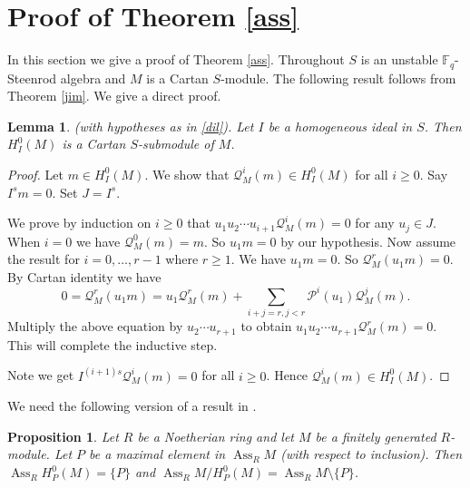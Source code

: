 \documentclass{amsart}
\newcommand{\F}{\mathbb{F} }
\newcommand{\Pc}{\mathcal{P} }
\newcommand{\Qc}{\mathcal{Q} }
\newcommand{\Ass}{\operatorname{Ass}}
\theoremstyle{plain}
\newtheorem{lemma}[theorem]{Lemma}
\newtheorem{proposition}[theorem]{Proposition}
\theoremstyle{definition}
\theoremstyle{remark}
\begin{document}
\section{Proof of Theorem \ref{ass}}
\s \label{dil} In this section we give a proof of Theorem \ref{ass}. Throughout $S$ is an unstable $\F_q$-Steenrod algebra and $M$ is a Cartan $S$-module. The following result follows from Theorem \ref{jim}. We give a direct proof.
\begin{lemma}
\label{water}(with hypotheses as in \ref{dil}). Let $I$ be a homogeneous ideal in $S$. Then $H^0_I(M)$ is a Cartan $S$-submodule of $M$.
\end{lemma}
\begin{proof}
  Let $m \in H^0_I(M)$. We show that $\Qc_M^i(m) \in H^0_I(M)$ for all $ i \geq 0$. Say $I^sm = 0$. Set $J = I^s$.
  
   We prove by induction on $i \geq 0$ that
  $u_1u_2\cdots u_{i+1}\Qc^i_M(m) =0$ for any $u_j \in J$. 
  When $i = 0$ we have $\Qc^0_M(m) =m$. So $u_1m = 0$ by our hypothesis. 
  Now assume the result for $i = 0, \ldots, r- 1$ where $r \geq 1$.
  We have $u_1m = 0$. So $\Qc_M^r(u_1m) = 0$. By Cartan identity we have
  $$ 0 = \Qc^r_M(u_1m) = u_1\Qc^r_M(m) + \sum_{i+j=r, j<r}\Pc^i(u_1)\Qc^j_M(m).$$
  Multiply the above equation by $u_2\cdots u_{r+1}$ to obtain
  $u_1u_2\cdots u_{r+1}\Qc^r_M(m) =0$. This will complete the inductive step.
  
  Note we get $I^{(i+1)s}\Qc^i_M(m) = 0$ for all $i \geq 0$. Hence $\Qc_M^i(m) \in H^0_I(M)$.
\end{proof}
We need the following version of a result in \cite[3.13]{Eis}.
\begin{proposition}
  \label{yesu-e}Let $R$ be a Noetherian ring and let $M$ be a finitely generated $R$-module. Let $P$ be a maximal element in $\Ass_R M$ (with respect to inclusion). Then
  $\Ass_R H^0_P(M) = \{ P \}$ and $\Ass_R M/H^0_P(M)  = \Ass_R M \setminus \{ P \}$.
\end{proposition}
\end{document}
